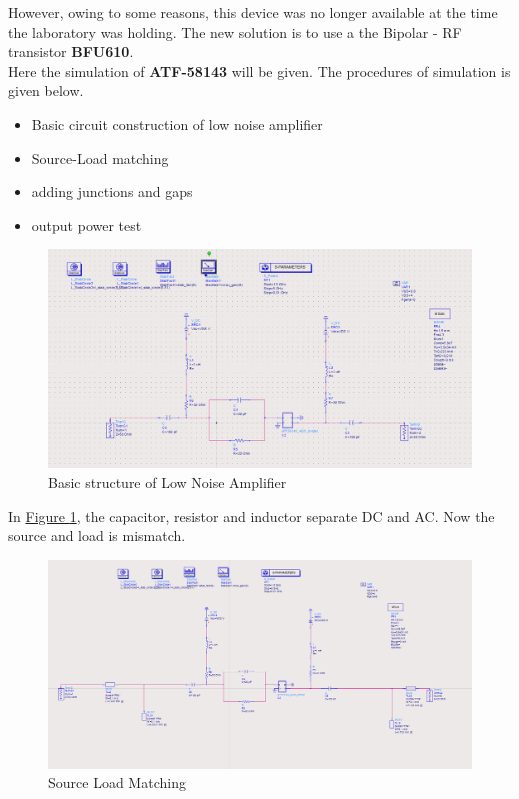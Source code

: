 \documentclass[12pt,a4paper]{report}
\begin{document}
However, owing to some reasons, this device was no longer available at the time the laboratory was holding.
The new solution is to use a the Bipolar - RF transistor \textbf{BFU610}.\\
Here the simulation of \textbf{ATF-58143} will be given. The procedures of simulation is given below.
\begin{itemize}
    \item Basic circuit construction of low noise amplifier
    \item Source-Load matching
    \item adding junctions and gaps
    \item output power test
\end{itemize}
\begin{figure}
    \centerline{\includegraphics[scale=0.5]{LNABasicCicuit.PNG}}
    \caption{Basic structure of Low Noise Amplifier}
    \label{LNA}
\end{figure}
In \hyperref[LNA]{Figure \ref*{LNA}}, the capacitor, resistor and inductor separate DC and AC. Now the source and load is mismatch.
\begin{figure}
    \centerline{\includegraphics[scale=0.5]{FirstMatching.PNG}}
    \caption{Source Load Matching}
    \label{fm}
\end{figure}
\end{document}
